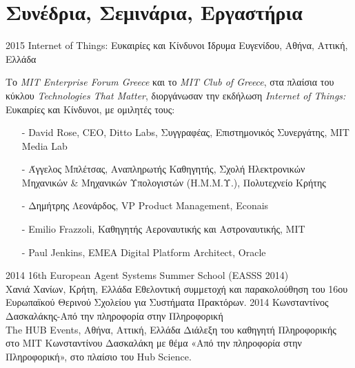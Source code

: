 \documentclass[print]{keros-cv} %
\begin{document}
\section{Συνέδρια, Σεμινάρια, Εργαστήρια}
\begin{entrylist}
\entry
{2015}
{Internet of Things: Ευκαιρίες και Κίνδυνοι}
{Ίδρυμα Ευγενίδου, Αθήνα, Αττική, Ελλάδα}
{Το \emph{MIT Enterprise Forum Greece} και το \emph{MIT Club of Greece}, στα πλαίσια του κύκλου \emph{Technologies That Matter}, διοργάνωσαν την εκδήλωση \emph{Internet of Things:} Ευκαιρίες και Κίνδυνοι, με ομιλητές τους:
\begin{itemize}
\item[-] David Rose, CEO, Ditto Labs, Συγγραφέας, Επιστημονικός Συνεργάτης, MIT Media Lab
\item[-] Άγγελος Μπλέτσας, Αναπληρωτής Καθηγητής, Σχολή Ηλεκτρονικών Μηχανικών \& Μηχανικών Υπολογιστών (Η.Μ.Μ.Υ.), Πολυτεχνείο Κρήτης
\item[-] Δημήτρης Λεονάρδος, VP Product Management, Econais
\item[-] Emilio Frazzoli, Καθηγητής Αεροναυτικής και Αστροναυτικής, MIT
\item[-] Paul Jenkins, EMEA Digital Platform Architect, Oracle
\end{itemize}
}
\entry
{2014}
{16th European Agent Systems Summer School (EASSS 2014)\\}
{Χανιά Χανίων, Κρήτη, Ελλάδα}
{Εθελοντική συμμετοχή και παρακολούθηση του 16ου Ευρωπαϊκού Θερινού Σχολείου για Συστήματα Πρακτόρων.}
\entry
{2014}
{Κωνσταντίνος Δασκαλάκης-Από την πληροφορία στην Πληροφορική\\}
{The HUB Events, Αθήνα, Αττική, Ελλάδα}
{Διάλεξη του καθηγητή Πληροφορικής στο MIT Κωνσταντίνου Δασκαλάκη με θέμα «Από την πληροφορία στην Πληροφορική», στο πλαίσιο του Hub Science.}
\end{entrylist}

\newpage
\end{document}
